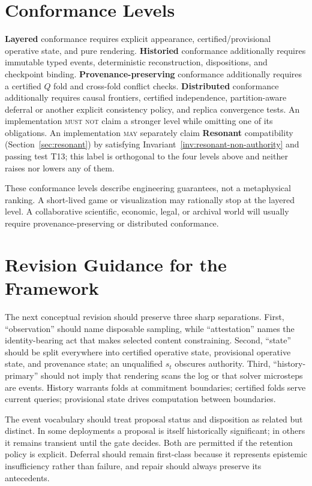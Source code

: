 \documentclass[11pt]{article}
\newcommand{\MUSTNOT}{\textsc{must not}}
\newcommand{\MAY}{\textsc{may}}
\begin{document}
\section{Conformance Levels}
\label{sec:conformance-levels}

\textbf{Layered} conformance requires explicit appearance, certified/provisional operative state, and pure rendering. \textbf{Historied} conformance additionally requires immutable typed events, deterministic reconstruction, dispositions, and checkpoint binding. \textbf{Provenance-preserving} conformance additionally requires a certified $Q$ fold and cross-fold conflict checks. \textbf{Distributed} conformance additionally requires causal frontiers, certified independence, partition-aware deferral or another explicit consistency policy, and replica convergence tests. An implementation \MUSTNOT{} claim a stronger level while omitting one of its obligations. An implementation \MAY{} separately claim \textbf{Resonant} compatibility (Section~\ref{sec:resonant}) by satisfying Invariant~\ref{inv:resonant-non-authority} and passing test T13; this label is orthogonal to the four levels above and neither raises nor lowers any of them.

These conformance levels describe engineering guarantees, not a metaphysical ranking. A short-lived game or visualization may rationally stop at the layered level. A collaborative scientific, economic, legal, or archival world will usually require provenance-preserving or distributed conformance.

\section{Revision Guidance for the Framework}
\label{sec:revision-guidance}

The next conceptual revision should preserve three sharp separations. First, ``observation'' should name disposable sampling, while ``attestation'' names the identity-bearing act that makes selected content constraining. Second, ``state'' should be split everywhere into certified operative state, provisional operative state, and provenance state; an unqualified $s_t$ obscures authority. Third, ``history-primary'' should not imply that rendering scans the log or that solver microsteps are events. History warrants folds at commitment boundaries; certified folds serve current queries; provisional state drives computation between boundaries.

The event vocabulary should treat proposal status and disposition as related but distinct. In some deployments a proposal is itself historically significant; in others it remains transient until the gate decides. Both are permitted if the retention policy is explicit. Deferral should remain first-class because it represents epistemic insufficiency rather than failure, and repair should always preserve its antecedents.
\end{document}
